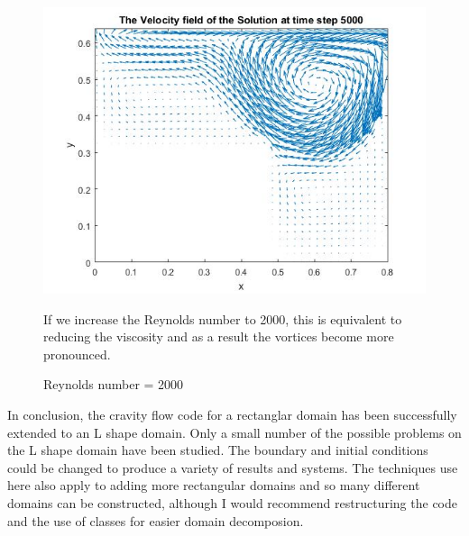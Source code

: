 \documentclass[11pt,a4paper,notitlepage]{article}
\begin{document}
\newpage

\begin{figure}[h]
\begin{minipage}{0.6\textwidth}
\includegraphics[width=1.1\linewidth]{Cavity2000Vel1.jpg}
\end{minipage}
\begin{minipage}{0.3\textwidth}
If we increase the Reynolds number to 2000, this is equivalent to reducing the viscosity and as a result the vortices become more pronounced.
\end{minipage}
\caption{Reynolds number = 2000}
\label{cav.2000vel1}
\end{figure}

In conclusion, the cravity flow code for a rectanglar domain has been successfully extended to an L shape domain. Only a small number of the possible problems on the L shape domain have been studied. The boundary and initial conditions could be changed to produce a variety of results and systems. The techniques use here also apply to adding more rectangular domains and so many different domains can be constructed, although I would recommend restructuring the code and the use of classes for easier domain decomposion.
\end{document}

